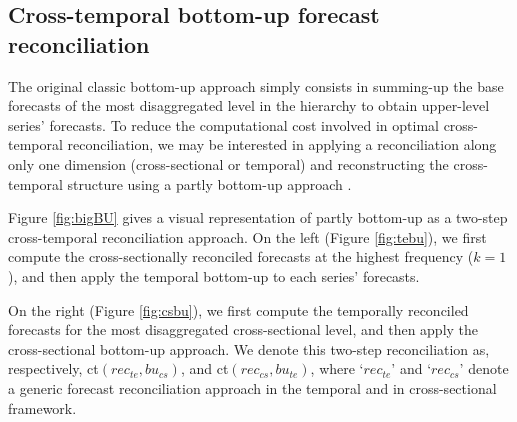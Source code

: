 \documentclass[a4paper,11pt]{article}
\theoremstyle{definition}
\begin{document}
\subsection{Cross-temporal bottom-up forecast reconciliation}\label{ssec:ctbu}


The original classic bottom-up approach \citep{dunn1976, dangerfield1992} simply consists in summing-up the base forecasts of the most disaggregated level in the hierarchy to obtain upper-level series’ forecasts. To reduce the computational cost involved in optimal cross-temporal reconciliation, we may be interested in applying a reconciliation along only one dimension (cross-sectional or temporal) and reconstructing the cross-temporal structure using a partly bottom-up approach \citep{difonzo2022b, difonzo2023a, sanguri2022}. 

Figure \ref{fig:bigBU} gives a visual representation of partly bottom-up as a two-step cross-temporal reconciliation approach. On the left (Figure \ref{fig:tebu}), we first compute the cross-sectionally reconciled forecasts at the highest frequency ($k = 1$), and then apply the temporal bottom-up to each series' forecasts. 

On the right (Figure \ref{fig:csbu}), we first compute the temporally reconciled forecasts for the most disaggregated cross-sectional level, and then apply the cross-sectional bottom-up approach. We denote this two-step reconciliation as, respectively, ct$(rec_{te},bu_{cs})$, and ct$(rec_{cs},bu_{te})$, where ‘$rec_{te}$’ and ‘$rec_{cs}$’ denote a generic forecast reconciliation approach in the temporal and in cross-sectional framework.
\end{document}
